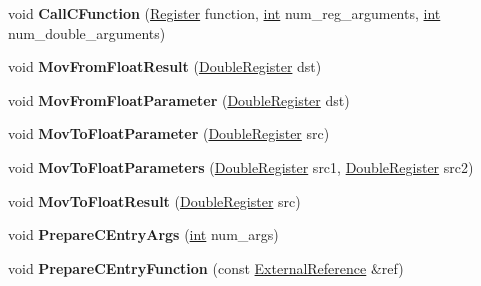 \begin{DoxyCompactItemize}
void {\bfseries Call\+C\+Function} (\mbox{\hyperlink{classv8_1_1internal_1_1Register}{Register}} function, \mbox{\hyperlink{classint}{int}} num\+\_\+reg\+\_\+arguments, \mbox{\hyperlink{classint}{int}} num\+\_\+double\+\_\+arguments)
\item 
\mbox{\label{classv8_1_1internal_1_1TurboAssembler_aa610efc2002fd48b4cf5062ff040576b}} 
void {\bfseries Mov\+From\+Float\+Result} (\mbox{\hyperlink{classv8_1_1internal_1_1DoubleRegister}{Double\+Register}} dst)
\item 
\mbox{\label{classv8_1_1internal_1_1TurboAssembler_a3ef3e6f02594d358e3385eac66ceab18}} 
void {\bfseries Mov\+From\+Float\+Parameter} (\mbox{\hyperlink{classv8_1_1internal_1_1DoubleRegister}{Double\+Register}} dst)
\item 
\mbox{\label{classv8_1_1internal_1_1TurboAssembler_ac49113791072985f3f489c24bb208c35}} 
void {\bfseries Mov\+To\+Float\+Parameter} (\mbox{\hyperlink{classv8_1_1internal_1_1DoubleRegister}{Double\+Register}} src)
\item 
\mbox{\label{classv8_1_1internal_1_1TurboAssembler_afe7fc2fe9aaf078764f1eadf12fe8d79}} 
void {\bfseries Mov\+To\+Float\+Parameters} (\mbox{\hyperlink{classv8_1_1internal_1_1DoubleRegister}{Double\+Register}} src1, \mbox{\hyperlink{classv8_1_1internal_1_1DoubleRegister}{Double\+Register}} src2)
\item 
\mbox{\label{classv8_1_1internal_1_1TurboAssembler_a0a80563e5b6000c3b0b135eea184ed52}} 
void {\bfseries Mov\+To\+Float\+Result} (\mbox{\hyperlink{classv8_1_1internal_1_1DoubleRegister}{Double\+Register}} src)
\item 
\mbox{\label{classv8_1_1internal_1_1TurboAssembler_a9312d460e753c6771e4f5840b40e49b1}} 
void {\bfseries Prepare\+C\+Entry\+Args} (\mbox{\hyperlink{classint}{int}} num\+\_\+args)
\item 
\mbox{\label{classv8_1_1internal_1_1TurboAssembler_aeb0209406c3f6ab13fbc23af79591291}} 
void {\bfseries Prepare\+C\+Entry\+Function} (const \mbox{\hyperlink{classv8_1_1internal_1_1ExternalReference}{External\+Reference}} \&ref)

\end{DoxyCompactItemize}
